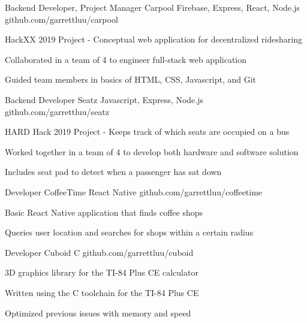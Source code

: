 \documentclass[]{awesome-cv}
\begin{document}
\vspace{-9mm}
\begin{cventries}

	\cventry
  {Backend Developer, Project Manager}
  {Carpool}
	{Firebase, Express, React, Node.js}
	{github.com/garrettluu/carpool}
  {\begin{cvitems}
    \item{HackXX 2019 Project - Conceptual web application for decentralized ridesharing}
    \item{Collaborated in a team of 4 to engineer full-stack web application}
    \item{Guided team members in basics of HTML, CSS, Javascript, and Git}
    \end{cvitems}}

	\vspace{-5mm}
	\cventry
  {Backend Developer}
	{Seatz}
	{Javascript, Express, Node.js}
	{github.com/garrettluu/seatz}
  {\begin{cvitems}
    \item{HARD Hack 2019 Project - Keeps track of which seats are occupied on a bus}
    \item{Worked together in a team of 4 to develop both hardware and software solution}
    \item{Includes seat pad to detect when a passenger has sat down}
    \end{cvitems}}

	\vspace{-5mm}
	\cventry
  {Developer}
  {CoffeeTime}
  {React Native}
	{github.com/garrettluu/coffeetime}
  {\begin{cvitems}
    \item{Basic React Native application that finds coffee shops}
    \item{Queries user location and searches for shops within a certain radius}
    \end{cvitems}}

	\vspace{-5mm}
	\cventry
  {Developer}
	{Cuboid}
	{C}
	{github.com/garrettluu/cuboid}
  {\begin{cvitems}
	  \item{3D graphics library for the TI-84 Plus CE calculator}
    \item{Written using the C toolchain for the TI-84 Plus CE}
    \item{Optimized previous issues with memory and speed}
    \end{cvitems}}

\end{cventries}
\end{document}
